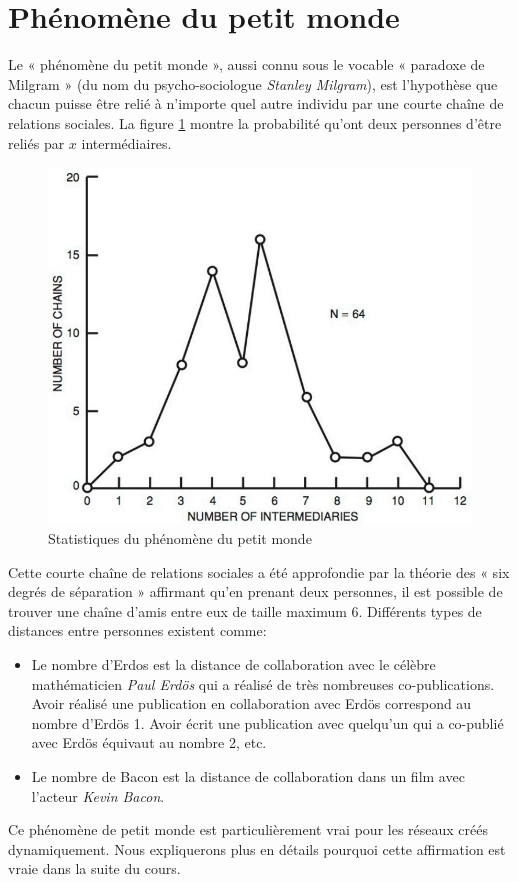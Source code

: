 \section{Phénomène du petit monde}
Le « phénomène du petit monde », aussi connu sous le vocable « paradoxe de Milgram » (du nom du psycho-sociologue  \textit{Stanley Milgram}), est l'hypothèse que chacun puisse être relié à n'importe quel autre individu par une courte chaîne de relations sociales. La figure \ref{petit_monde} montre la probabilité qu'ont deux personnes d'être reliés par $x$ intermédiaires. 
	\begin{figure}
	\center
	\includegraphics[scale=1]{images/18_fig.png}
	\caption{\label{petit_monde} Statistiques du phénomène du petit monde}
	\end{figure}
Cette  courte chaîne de relations sociales a été approfondie par la théorie des « six degrés de séparation » affirmant qu'en prenant deux personnes, il est possible de trouver une chaîne d'amis entre eux de taille maximum 6.
Différents types de distances entre personnes existent comme:
	\begin{itemize}
	\item Le nombre d'Erdos est la distance de collaboration avec le célèbre mathématicien  \textit{Paul Erdös} qui a réalisé de très nombreuses co-publications. Avoir réalisé une publication en collaboration avec Erdös correspond au nombre d'Erdös 1. Avoir écrit une publication avec quelqu'un qui a co-publié avec Erdös équivaut au nombre 2, etc.
	\item Le nombre de Bacon est la distance de collaboration dans un film avec l'acteur  \textit{Kevin Bacon}.
	\end{itemize}
Ce phénomène de petit monde est particulièrement vrai pour les réseaux créés dynamiquement. Nous expliquerons plus en détails pourquoi cette affirmation est vraie dans la suite du cours.

